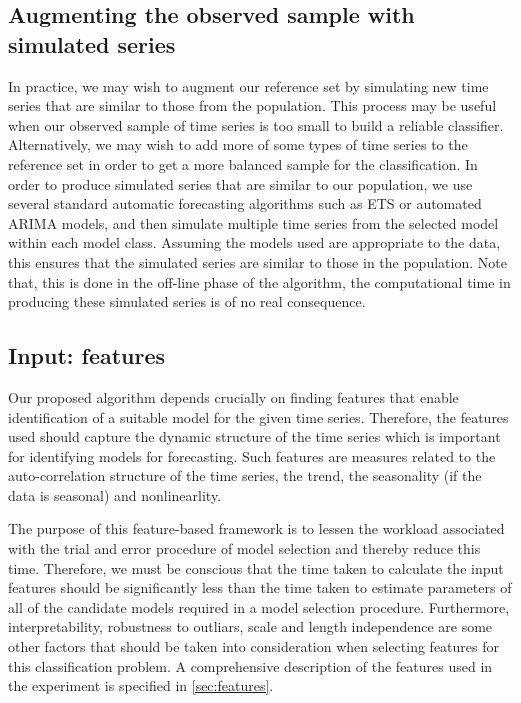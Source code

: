 \documentclass[11pt,a4paper,]{article}
\theoremstyle{definition}
\theoremstyle{definition}
\theoremstyle{definition}
\theoremstyle{remark}
\begin{document}
\subsection{Augmenting the observed sample with simulated
series}\label{augmenting-the-observed-sample-with-simulated-series}

In practice, we may wish to augment our reference set by simulating new
time series that are similar to those from the population. This process
may be useful when our observed sample of time series is too small to
build a reliable classifier. Alternatively, we may wish to add more of
some types of time series to the reference set in order to get a more
balanced sample for the classification. In order to produce simulated
series that are similar to our population, we use several standard
automatic forecasting algorithms such as ETS or automated ARIMA models,
and then simulate multiple time series from the selected model within
each model class. Assuming the models used are appropriate to the data,
this ensures that the simulated series are similar to those in the
population. Note that, this is done in the off-line phase of the
algorithm, the computational time in producing these simulated series is
of no real consequence.

\subsection{Input: features}\label{input-features}

Our proposed algorithm depends crucially on finding features that enable
identification of a suitable model for the given time series. Therefore,
the features used should capture the dynamic structure of the time
series which is important for identifying models for forecasting. Such
features are measures related to the auto-correlation structure of the
time series, the trend, the seasonality (if the data is seasonal) and
nonlinearlity.

The purpose of this feature-based framework is to lessen the workload
associated with the trial and error procedure of model selection and
thereby reduce this time. Therefore, we must be conscious that the time
taken to calculate the input features should be significantly less than
the time taken to estimate parameters of all of the candidate models
required in a model selection procedure. Furthermore, interpretability,
robustness to outliars, scale and length independence are some other
factors that should be taken into consideration when selecting features
for this classification problem. A comprehensive description of the
features used in the experiment is specified in \autoref{sec:features}.
\end{document}
